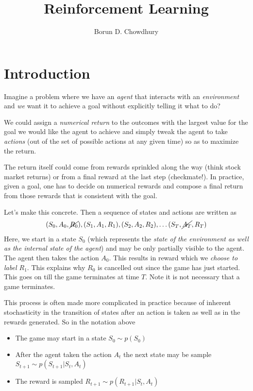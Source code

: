 \documentclass[11pt,a4paper]{article}
\title{Reinforcement Learning}
\author{Borun D. Chowdhury}
\newcommand\be{\begin{equation}}
\newcommand\ee{\end{equation}}
\begin{document}
\maketitle
\tableofcontents

\section{Introduction}

Imagine a problem where we have an {\em agent} that interacts with an {\em environment} and {\em we} want it to achieve a goal without explicitly telling it what to do? 

We could assign a {\em numerical return} to the outcomes with the largest value for the goal we would like the agent to achieve and simply tweak the agent to take {\em actions} (out of the set of possible actions at any given time) so as to maximize the return.  

The return itself could come from rewards sprinkled along the way (think stock market returns) or from a final reward at the last step (checkmate!). In practice, given a goal, one has to decide on numerical rewards and compose a final return from those rewards that is consistent with the goal.

Let's make this concrete. Then a sequence of states and actions are written as 
\be
(S_0,A_0,\cancel{R_0}), (S_1,A_1,R_1),(S_2,A_2,R_2), \dots (S_T,\cancel{A_T},R_T) 
\ee
Here, we start in a state $S_0$ (which represents the {\em state of the environment as well as the internal state of the agent}) and may be only partially visible to the agent. The agent then takes the action $A_0$. This results in reward which we {\em choose to label $R_1$}. This explains why $R_0$ is cancelled out since the game has just started. This goes on till the game terminates at time $T$. Note it is not necessary that a game terminates.

This process is often made more complicated in practice because of inherent stochasticity in the transition of states after an action is taken as well as in the rewards generated. So in the notation above
\begin{itemize}
\item The game may start in a state $S_0 \sim p(S_0)$
\item After the agent taken the action $A_t$ the next state may be sample $S_{t+1} \sim p(S_{t+1}|S_t,A_t)$
\item The reward is sampled $R_{t+1} \sim p(R_{t+1}|S_t,A_t)$
\end{itemize}
\end{document}

